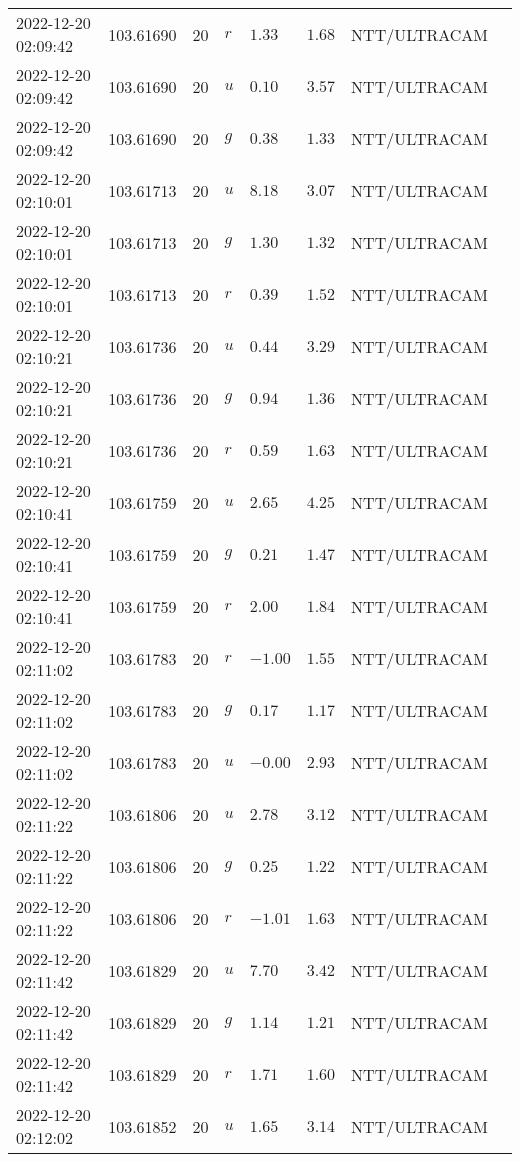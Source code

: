 \documentclass{nature_plusfigure}
\begin{document}
\begin{supplement}
\begin{center}
\begin{longtable}{llllllll}
2022-12-20 02:09:42 & 103.61690 & 20 & $r$ & $1.33$ & $1.68$ & NTT/ULTRACAM &  \\ 
2022-12-20 02:09:42 & 103.61690 & 20 & $u$ & $0.10$ & $3.57$ & NTT/ULTRACAM &  \\ 
2022-12-20 02:09:42 & 103.61690 & 20 & $g$ & $0.38$ & $1.33$ & NTT/ULTRACAM &  \\ 
2022-12-20 02:10:01 & 103.61713 & 20 & $u$ & $8.18$ & $3.07$ & NTT/ULTRACAM &  \\ 
2022-12-20 02:10:01 & 103.61713 & 20 & $g$ & $1.30$ & $1.32$ & NTT/ULTRACAM &  \\ 
2022-12-20 02:10:01 & 103.61713 & 20 & $r$ & $0.39$ & $1.52$ & NTT/ULTRACAM &  \\ 
2022-12-20 02:10:21 & 103.61736 & 20 & $u$ & $0.44$ & $3.29$ & NTT/ULTRACAM &  \\ 
2022-12-20 02:10:21 & 103.61736 & 20 & $g$ & $0.94$ & $1.36$ & NTT/ULTRACAM &  \\ 
2022-12-20 02:10:21 & 103.61736 & 20 & $r$ & $0.59$ & $1.63$ & NTT/ULTRACAM &  \\ 
2022-12-20 02:10:41 & 103.61759 & 20 & $u$ & $2.65$ & $4.25$ & NTT/ULTRACAM &  \\ 
2022-12-20 02:10:41 & 103.61759 & 20 & $g$ & $0.21$ & $1.47$ & NTT/ULTRACAM &  \\ 
2022-12-20 02:10:41 & 103.61759 & 20 & $r$ & $2.00$ & $1.84$ & NTT/ULTRACAM &  \\ 
2022-12-20 02:11:02 & 103.61783 & 20 & $r$ & $-1.00$ & $1.55$ & NTT/ULTRACAM &  \\ 
2022-12-20 02:11:02 & 103.61783 & 20 & $g$ & $0.17$ & $1.17$ & NTT/ULTRACAM &  \\ 
2022-12-20 02:11:02 & 103.61783 & 20 & $u$ & $-0.00$ & $2.93$ & NTT/ULTRACAM &  \\ 
2022-12-20 02:11:22 & 103.61806 & 20 & $u$ & $2.78$ & $3.12$ & NTT/ULTRACAM &  \\ 
2022-12-20 02:11:22 & 103.61806 & 20 & $g$ & $0.25$ & $1.22$ & NTT/ULTRACAM &  \\ 
2022-12-20 02:11:22 & 103.61806 & 20 & $r$ & $-1.01$ & $1.63$ & NTT/ULTRACAM &  \\ 
2022-12-20 02:11:42 & 103.61829 & 20 & $u$ & $7.70$ & $3.42$ & NTT/ULTRACAM &  \\ 
2022-12-20 02:11:42 & 103.61829 & 20 & $g$ & $1.14$ & $1.21$ & NTT/ULTRACAM &  \\ 
2022-12-20 02:11:42 & 103.61829 & 20 & $r$ & $1.71$ & $1.60$ & NTT/ULTRACAM &  \\ 
2022-12-20 02:12:02 & 103.61852 & 20 & $u$ & $1.65$ & $3.14$ & NTT/ULTRACAM &  \\ 

\end{longtable}
\end{center}
\end{supplement}
\end{document}
